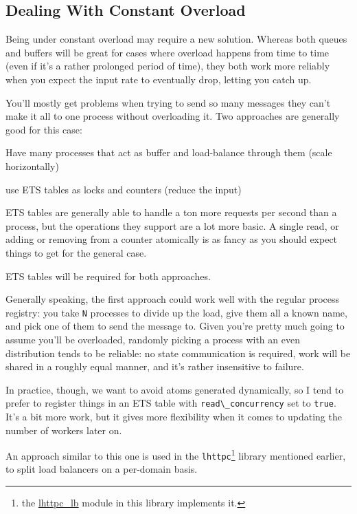 \documentclass[11pt, oneside]{book}   	%
\newcommand{\module}[1]{\Verb`#1`}
\newcommand{\expression}[1]{\Verb`#1`}
\newcommand{\var}[1]{\Verb`#1`}
\begin{document}
\subsection{Dealing With Constant Overload}

Being under constant overload may require a new solution. Whereas both queues and buffers will be great for cases where overload happens from time to time (even if it's a rather prolonged period of time), they both work more reliably when you expect the input rate to eventually drop, letting you catch up.

You'll mostly get problems when trying to send so many messages they can't make it all to one process without overloading it. Two approaches are generally good for this case:

\begin{itemize*}
	\item Have many processes that act as buffer and load-balance through them (scale horizontally)
	\item use ETS tables as locks and counters (reduce the input)
\end{itemize*}

ETS tables are generally able to handle a ton more requests per second than a process, but the operations they support are a lot more basic. A single read, or adding or removing from a counter atomically is as fancy as you should expect things to get for the general case.

ETS tables will be required for both approaches.

Generally speaking, the first approach could work well with the regular process registry: you take \var{N} processes to divide up the load, give them all a known name, and pick one of them to send the message to. Given you're pretty much going to assume you'll be overloaded, randomly picking a process with an even distribution tends to be reliable: no state communication is required, work will be shared in a roughly equal manner, and it's rather insensitive to failure.

In practice, though, we want to avoid atoms generated dynamically, so I tend to prefer to register things in an ETS table with \expression{read\_concurrency} set to \expression{true}. It's a bit more work, but it gives more flexibility when it comes to updating the number of workers later on.

An approach similar to this one is used in the \module{lhttpc}\footnote{the \href{https://github.com/ferd/lhttpc/blob/master/src/lhttpc\_lb.erl}{lhttpc\_lb} module in this library implements it.} library mentioned earlier, to split load balancers on a per-domain basis.
\end{document}
